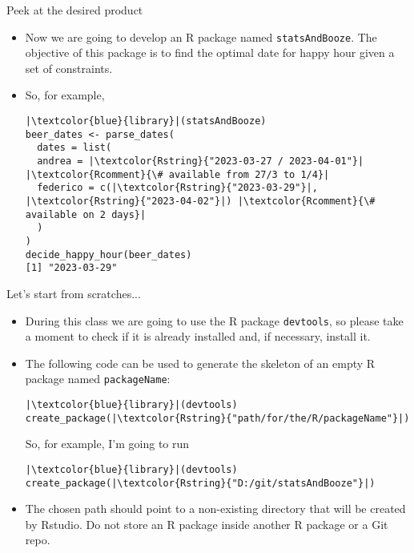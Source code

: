 \documentclass[
hyperref={bookmarks=false},
xcolor={dvipsnames,svgnames*,x11names*}, 
12pt
]{beamer}
\begin{document}
\begin{frame}[fragile]{Peek at the desired product}
\vspace{-0.5cm}
\begin{itemize}
\itemsep 2ex
\item Now we are going to develop an R package named \texttt{statsAndBooze}. The objective of this package is to find the optimal date for happy hour given a set of constraints. 
\item So, for example, 
\begin{lstlisting}
|\textcolor{blue}{library}|(statsAndBooze)
beer_dates <- parse_dates(
  dates = list(
  andrea = |\textcolor{Rstring}{"2023-03-27 / 2023-04-01"}| |\textcolor{Rcomment}{\# available from 27/3 to 1/4}|
  federico = c(|\textcolor{Rstring}{"2023-03-29"}|, |\textcolor{Rstring}{"2023-04-02"}|) |\textcolor{Rcomment}{\# available on 2 days}|
  )
)
decide_happy_hour(beer_dates)
[1] "2023-03-29"
\end{lstlisting}
\end{itemize}
\end{frame}


\begin{frame}[fragile]{Let's start from scratches...}
\vspace{-0.5cm}
\begin{itemize}
\itemsep 2ex
\item During this class we are going to use the R package \texttt{devtools}, so please take a moment to check if it is already installed and, if necessary, install it. 
\item The following code can be used to generate the skeleton of an empty R package named \texttt{packageName}:
\begin{lstlisting}
|\textcolor{blue}{library}|(devtools)
create_package(|\textcolor{Rstring}{"path/for/the/R/packageName"}|)
\end{lstlisting}
So, for example, I'm going to run
\begin{lstlisting}
|\textcolor{blue}{library}|(devtools)
create_package(|\textcolor{Rstring}{"D:/git/statsAndBooze"}|)
\end{lstlisting}
\item The chosen path should point to a non-existing directory that will be created by Rstudio. Do not store an R package inside another R package or a Git repo. 
\end{itemize}
\end{frame}
\end{document}
